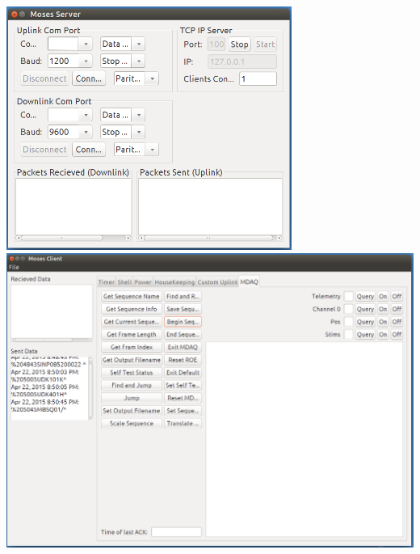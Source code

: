 \documentclass[landscape,xcolor={table},10pt]{beamer}
\begin{document}
\begin{frame}
\begin{columns}[T]
\begin{column}{.45\textwidth}
			\includegraphics[width=0.7\textwidth]{server_scr} \\
			\includegraphics[width=\textwidth]{client_scr}
					
		\end{column}%
		\end{columns}

	\end{frame}
	
\end{document}
